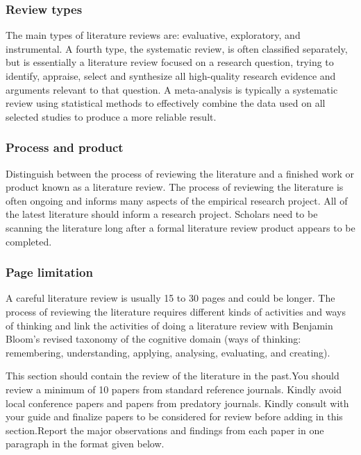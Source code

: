 \subsubsection[Review types]{\textbf{Review types}}

The main types of literature reviews are: evaluative, exploratory, and instrumental. A fourth type, the systematic review, is often classified separately, but is essentially a literature review focused on a research question, trying to identify, appraise, select and synthesize all high-quality research evidence and arguments relevant to that question. A meta-analysis is typically a systematic review using statistical methods to effectively combine the data used on all selected studies to produce a more reliable result.


\subsubsection[Process and product]{\textbf{Process and product}}

Distinguish between the process of reviewing the literature and a finished work or product known as a literature review. The process of reviewing the literature is often ongoing and informs many aspects of the empirical research project. All of the latest literature should inform a research project. Scholars need to be scanning the literature long after a formal literature review product appears to be completed.

\subsubsection{\textbf{Page limitation}}

A careful literature review is usually 15 to 30 pages and could be longer. The process of reviewing the literature requires different kinds of activities and ways of thinking and link the activities of doing a literature review with Benjamin Bloom’s revised taxonomy of the cognitive domain (ways of thinking: remembering, understanding, applying, analysing, evaluating, and creating).

This section should contain the review of the literature in the past.You should review a minimum of 10 papers from standard reference journals. Kindly avoid local conference papers and papers from predatory journals. Kindly consult with your guide and finalize papers to be considered for review before adding in this section.Report the major observations and findings from each paper in one paragraph in the format given below.

